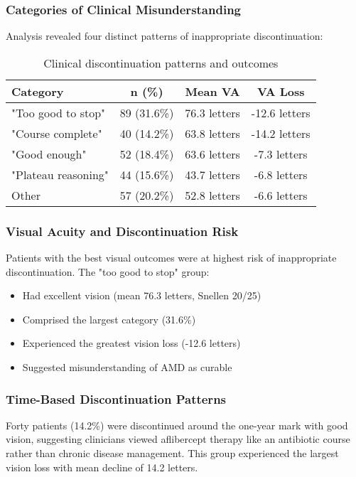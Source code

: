 \subsubsection{Categories of Clinical Misunderstanding}

Analysis revealed four distinct patterns of inappropriate discontinuation:

\begin{table}[h]
\centering
\begin{tabular}{p{3.5cm}ccc}
\hline
\textbf{Category} & \textbf{n (\%)} & \textbf{Mean VA} & \textbf{VA Loss} \\
\hline
"Too good to stop" & 89 (31.6\%) & 76.3 letters & -12.6 letters \\
"Course complete" & 40 (14.2\%) & 63.8 letters & -14.2 letters \\
"Good enough" & 52 (18.4\%) & 63.6 letters & -7.3 letters \\
"Plateau reasoning" & 44 (15.6\%) & 43.7 letters & -6.8 letters \\
Other & 57 (20.2\%) & 52.8 letters & -6.6 letters \\
\hline
\end{tabular}
\caption{Clinical discontinuation patterns and outcomes}
\end{table}

\subsubsection{Visual Acuity and Discontinuation Risk}

Patients with the best visual outcomes were at highest risk of inappropriate discontinuation. The "too good to stop" group:

\begin{itemize}
    \item Had excellent vision (mean 76.3 letters, Snellen 20/25)
    \item Comprised the largest category (31.6\%)
    \item Experienced the greatest vision loss (-12.6 letters)
    \item Suggested misunderstanding of AMD as curable
\end{itemize}

\subsubsection{Time-Based Discontinuation Patterns}

Forty patients (14.2\%) were discontinued around the one-year mark with good vision, suggesting clinicians viewed aflibercept therapy like an antibiotic course rather than chronic disease management. This group experienced the largest vision loss with mean decline of 14.2 letters.

